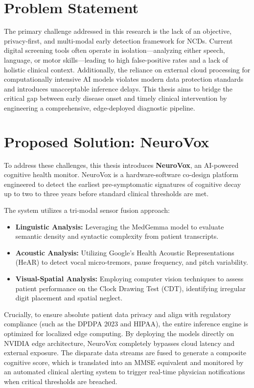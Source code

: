 \documentclass[BTech]{iitmdiss}
\begin{document}
\section{Problem Statement}
The primary challenge addressed in this research is the lack of an objective, privacy-first, and multi-modal early detection framework for NCDs. Current digital screening tools often operate in isolation—analyzing either speech, language, or motor skills—leading to high false-positive rates and a lack of holistic clinical context. Additionally, the reliance on external cloud processing for computationally intensive AI models violates modern data protection standards and introduces unacceptable inference delays. This thesis aims to bridge the critical gap between early disease onset and timely clinical intervention by engineering a comprehensive, edge-deployed diagnostic pipeline.

\section{Proposed Solution: NeuroVox}
To address these challenges, this thesis introduces \textbf{NeuroVox}, an AI-powered cognitive health monitor. NeuroVox is a hardware-software co-design platform engineered to detect the earliest pre-symptomatic signatures of cognitive decay up to two to three years before standard clinical thresholds are met. 

The system utilizes a tri-modal sensor fusion approach:
\begin{itemize}
    \item \textbf{Linguistic Analysis:} Leveraging the MedGemma model to evaluate semantic density and syntactic complexity from patient transcripts.
    \item \textbf{Acoustic Analysis:} Utilizing Google's Health Acoustic Representations (HeAR) to detect vocal micro-tremors, pause frequency, and pitch variability.
    \item \textbf{Visual-Spatial Analysis:} Employing computer vision techniques to assess patient performance on the Clock Drawing Test (CDT), identifying irregular digit placement and spatial neglect.
\end{itemize}

Crucially, to ensure absolute patient data privacy and align with regulatory compliance (such as the DPDPA 2023 and HIPAA), the entire inference engine is optimized for localized edge computing. By deploying the models directly on NVIDIA edge architecture, NeuroVox completely bypasses cloud latency and external exposure. The disparate data streams are fused to generate a composite cognitive score, which is translated into an MMSE equivalent and monitored by an automated clinical alerting system to trigger real-time physician notifications when critical thresholds are breached.
\end{document}
